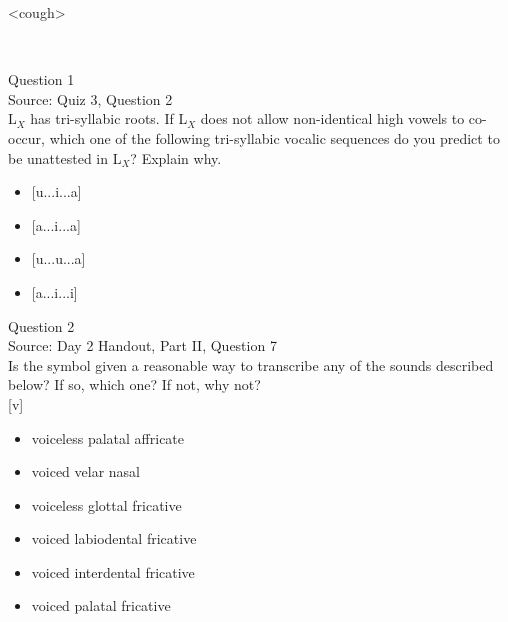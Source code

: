 \documentclass[12pt]{article}
\begin{document}
<cough>


\newpage

\begin{center}
\textbf{{\color{red}{\HUGE END OF EXAM}}}\\

\end{center}
\newpage

\begin{center}
\textbf{{\color{blue}{\HUGE START OF EXAM\\}}}

\textbf{{\color{blue}{\HUGE Student ID: 3288\\}}}

\textbf{{\color{blue}{\HUGE 1:45 - 2:00 PM\\}}}

\end{center}
\newpage

{\large Question 1}\\

Source: Quiz 3, Question 2\\

L$_X$ has tri-syllabic roots. If L$_X$ does not allow non-identical high vowels to co-occur, which one of the following tri-syllabic vocalic sequences do you predict to be unattested in L$_X$? Explain why.\\

\begin{itemize} \item {[u...i...a]} \item {[a...i...a]} \item {[u...u...a]} \item {[a...i...i]} \end{itemize}


\newpage

{\large Question 2}\\

Source: Day 2 Handout, Part II, Question 7\\

Is the symbol given a reasonable way to transcribe any of the sounds described below? If so, which one? If not, why not?\\

{[v]}

\begin{itemize} \item voiceless palatal affricate \item voiced velar nasal \item voiceless glottal fricative \item voiced labiodental fricative \item voiced interdental fricative \item voiced palatal fricative \end{itemize}
\end{document}
